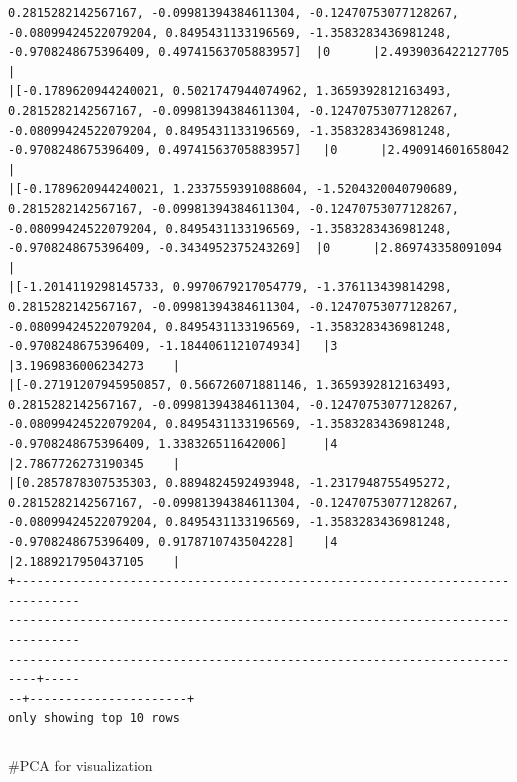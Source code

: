 \documentclass[11pt]{article}
\begin{document}
\begin{Verbatim}[commandchars=\\\{\}]
0.2815282142567167, -0.09981394384611304, -0.12470753077128267,
-0.08099424522079204, 0.8495431133196569, -1.3583283436981248,
-0.9708248675396409, 0.49741563705883957]  |0      |2.4939036422127705    |
|[-0.1789620944240021, 0.5021747944074962, 1.3659392812163493,
0.2815282142567167, -0.09981394384611304, -0.12470753077128267,
-0.08099424522079204, 0.8495431133196569, -1.3583283436981248,
-0.9708248675396409, 0.49741563705883957]   |0      |2.490914601658042     |
|[-0.1789620944240021, 1.2337559391088604, -1.5204320040790689,
0.2815282142567167, -0.09981394384611304, -0.12470753077128267,
-0.08099424522079204, 0.8495431133196569, -1.3583283436981248,
-0.9708248675396409, -0.3434952375243269]  |0      |2.869743358091094     |
|[-1.2014119298145733, 0.9970679217054779, -1.376113439814298,
0.2815282142567167, -0.09981394384611304, -0.12470753077128267,
-0.08099424522079204, 0.8495431133196569, -1.3583283436981248,
-0.9708248675396409, -1.1844061121074934]   |3      |3.1969836006234273    |
|[-0.27191207945950857, 0.566726071881146, 1.3659392812163493,
0.2815282142567167, -0.09981394384611304, -0.12470753077128267,
-0.08099424522079204, 0.8495431133196569, -1.3583283436981248,
-0.9708248675396409, 1.338326511642006]     |4      |2.7867726273190345    |
|[0.2857878307535303, 0.8894824592493948, -1.2317948755495272,
0.2815282142567167, -0.09981394384611304, -0.12470753077128267,
-0.08099424522079204, 0.8495431133196569, -1.3583283436981248,
-0.9708248675396409, 0.9178710743504228]    |4      |2.1889217950437105    |
+-------------------------------------------------------------------------------
--------------------------------------------------------------------------------
--------------------------------------------------------------------------+-----
--+----------------------+
only showing top 10 rows

    \end{Verbatim}

    \begin{Verbatim}[commandchars=\\\{\}]

    \end{Verbatim}

    \#PCA for visualization
\end{document}
